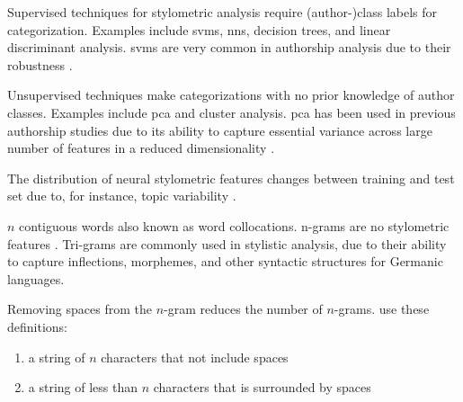 \begin{definition}
    Supervised techniques for stylometric analysis require (author-)class labels for categorization.
    Examples include \acp{svm}, \acp{nn}, decision trees, and linear discriminant analysis.
    \acp{svm} are very common in authorship analysis due to their robustness \cite{abbasi_writeprints_2008}.
\end{definition}

\begin{definition}
    Unsupervised techniques make categorizations with no prior knowledge of author classes.
    Examples include \ac{pca} and cluster analysis.
    \ac{pca} has been used in previous authorship studies due to its ability to 
    capture essential variance across large number of features in a reduced dimensionality \cite{abbasi_writeprints_2008}.
\end{definition}

\begin{definition}
    The distribution of neural stylometric features changes between training and test set due to, for instance, topic variability \cite{boenninghoff_o2d2_2021}.
\end{definition}

\begin{definition}
    [n-gram]
    $n$ contiguous words also known as word collocations. 
    n-grams are no stylometric features \cite{altakrori_topic_2021}.
    Tri-grams are commonly used in stylistic analysis, due to their ability to capture inflections, %
    morphemes, %
    and other syntactic structures for Germanic languages.

\end{definition}

\begin{definition}
    Removing spaces from the $n$-gram reduces the number of $n$-grams.
    \citet{koppel_authorship_2011} use these definitions:
    \begin{enumerate}
        \item a string of $n$ characters that not include spaces
        \item a string of less than $n$ characters that is surrounded by spaces
    \end{enumerate}
\end{definition}

